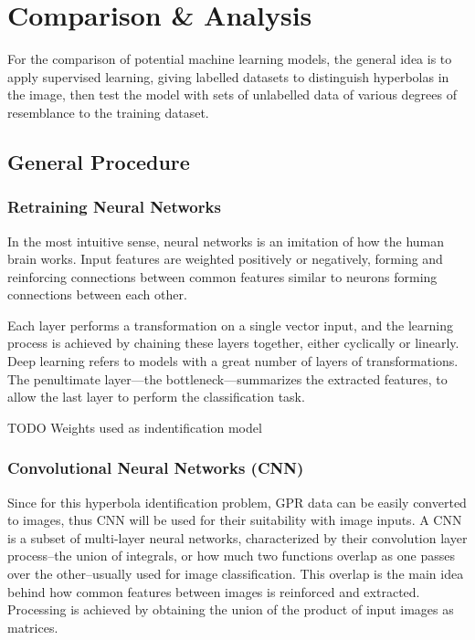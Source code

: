 \documentclass[se,blockletter]{uw-wkrpt}
\begin{document}
\section{Comparison \& Analysis}
For the comparison of potential machine learning models, the general idea is to apply supervised learning, giving labelled datasets to distinguish hyperbolas in the image, then test the model with sets of unlabelled data of various degrees of resemblance to the training dataset.

\subsection{General Procedure}
\subsubsection{Retraining Neural Networks}
In the most intuitive sense, neural networks is an imitation of how the human brain works. Input features are weighted positively or negatively, forming and reinforcing connections between common features similar to neurons forming connections between each other.

Each layer performs a transformation on a single vector input, and the learning process is achieved by chaining these layers together, either cyclically or linearly. Deep learning refers to models with a great number of layers of transformations. The penultimate layer---the bottleneck---summarizes the extracted features, to allow the last layer to perform the classification task. 

TODO Weights used as indentification model

\subsubsection{Convolutional Neural Networks (CNN)}
Since for this hyperbola identification problem, GPR data can be easily converted to images, thus CNN will be used for their suitability with image inputs. A CNN is a subset of multi-layer neural networks, characterized by their convolution layer process--the union of integrals, or how much two functions overlap as one passes over the other--usually used for image classification. This overlap is the main idea behind how common features between images is reinforced and extracted. Processing is achieved by obtaining the union of the product of input images as matrices.
\end{document}
